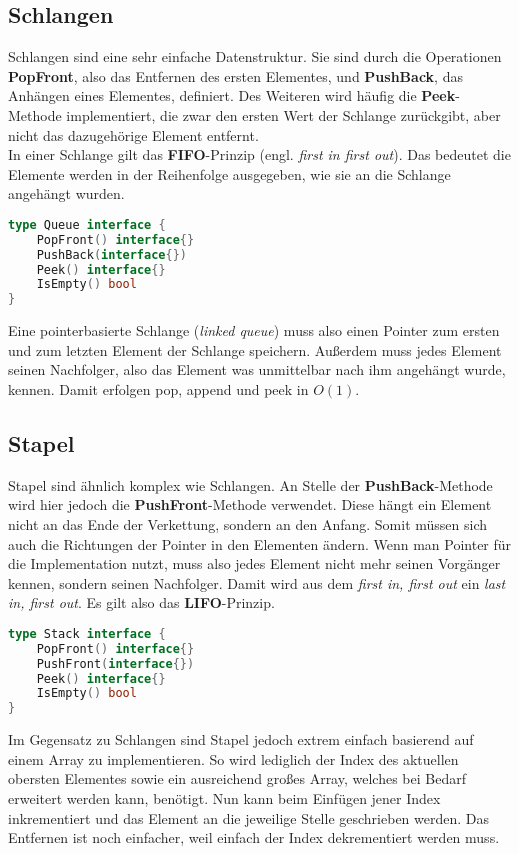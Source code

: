 \documentclass{article}
\begin{document}
\subsection{Schlangen}
Schlangen sind eine sehr einfache Datenstruktur. Sie sind durch die Operationen \textbf{PopFront}, also das Entfernen des ersten Elementes, und \textbf{PushBack}, das Anhängen eines Elementes, definiert. Des Weiteren wird häufig die \textbf{Peek}-Methode implementiert, die zwar den ersten Wert der Schlange zurückgibt, aber nicht das dazugehörige Element entfernt.\\
In einer Schlange gilt das \textbf{FIFO}-Prinzip (engl. \emph{first in first out}). Das bedeutet die Elemente werden in der Reihenfolge ausgegeben, wie sie an die Schlange angehängt wurden.
\begin{lstlisting}[language=go]
type Queue interface {
    PopFront() interface{}
    PushBack(interface{})
    Peek() interface{}
    IsEmpty() bool
}
\end{lstlisting}
Eine pointerbasierte Schlange (\emph{linked queue}) muss also einen Pointer zum ersten und zum letzten Element der Schlange speichern. Außerdem muss jedes Element seinen Nachfolger, also das Element was unmittelbar nach ihm angehängt wurde, kennen. Damit erfolgen pop, append und peek in $O(1)$.
\subsection{Stapel}
Stapel sind ähnlich komplex wie Schlangen. An Stelle der \textbf{PushBack}-Methode wird hier jedoch die \textbf{PushFront}-Methode verwendet. Diese hängt ein Element nicht an das Ende der Verkettung, sondern an den Anfang. Somit müssen sich auch die Richtungen der Pointer in den Elementen ändern. Wenn man Pointer für die Implementation nutzt, muss also jedes Element nicht mehr seinen Vorgänger kennen, sondern seinen Nachfolger. Damit wird aus dem \emph{first in, first out} ein \emph{last in, first out}. Es gilt also das \textbf{LIFO}-Prinzip.
\begin{lstlisting}[language=go]
type Stack interface {
    PopFront() interface{}
    PushFront(interface{})
    Peek() interface{}
    IsEmpty() bool
}
\end{lstlisting}
Im Gegensatz zu Schlangen sind Stapel jedoch extrem einfach basierend auf einem Array zu implementieren. So wird lediglich der Index des aktuellen obersten Elementes sowie ein ausreichend großes Array, welches bei Bedarf erweitert werden kann, benötigt. Nun kann beim Einfügen jener Index inkrementiert und das Element an die jeweilige Stelle geschrieben werden. Das Entfernen ist noch einfacher, weil einfach der Index dekrementiert werden muss.
\end{document}
